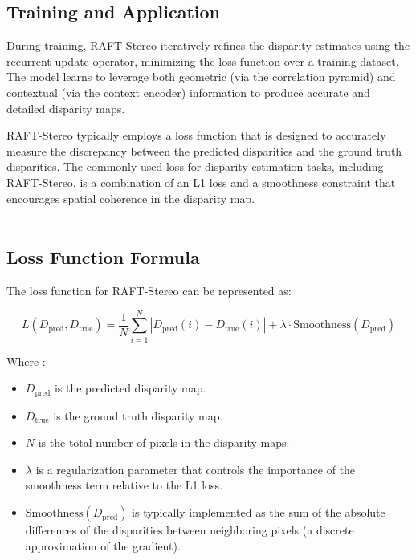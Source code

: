 \documentclass[22pt]{report}
\begin{document}
\subsection{Training and Application}
During training, RAFT-Stereo iteratively refines the disparity estimates using the recurrent update operator, minimizing the loss function over a training dataset. The model learns to leverage both geometric (via the correlation pyramid) and contextual (via the context encoder) information to produce accurate and detailed disparity maps.


\vspace{15}
RAFT-Stereo typically employs a loss function that is designed to accurately measure the discrepancy between the predicted disparities and the ground truth disparities. The commonly used loss for disparity estimation tasks, including RAFT-Stereo, is a combination of an L1 loss and a smoothness constraint that encourages spatial coherence in the disparity map.\\
\\
\subsection{Loss Function Formula}
The loss function for RAFT-Stereo can be represented as:
\begin{center}
        \[
        L(D_{\text{pred}}, D_{\text{true}}) = \frac{1}{N} \sum_{i=1}^{N} \left| D_{\text{pred}}(i) - D_{\text{true}}(i) \right| + \lambda \cdot \text{Smoothness}(D_{\text{pred}})
        \]
\end{center}
Where : 
\begin{itemize}
    \item \( D_{\text{pred}} \) is the predicted disparity map. \\
    \item \( D_{\text{true}} \) is the ground truth disparity map. \\
    \item \( N \) is the total number of pixels in the disparity maps. \\
    \item \( \lambda \) is a regularization parameter that controls the importance of the smoothness term relative to the L1 loss. \\
    \item \(\text{Smoothness}(D_{\text{pred}})\) is typically implemented as the sum of the absolute differences of the disparities between neighboring pixels (a discrete approximation of the gradient).
\end{itemize}
\end{document}
